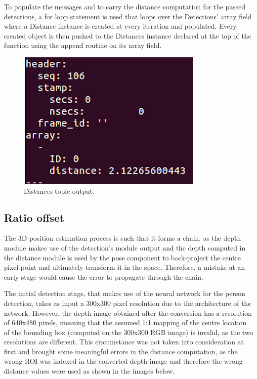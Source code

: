To populate the messages and to carry the distance computation for the passed detections, a for loop statement is used that loops over the Detections' array field where a Distance instance is created at every iteration and populated. Every created object is then pushed to the Distances instance declared at the top of the function using the append routine on its array field.

\begin{figure}[H]
  \begin{center}
    \includegraphics[width=.5\linewidth]{images/chapter4.png}
  \end{center}
  \caption{Distances topic output.}
  \label{fig:distance_topic}
\end{figure}

\subsection{Ratio offset}

The 3D position estimation process is such that it forms a chain, as the depth module makes use of the detection's module output and the depth computed in the distance module is used by the pose component to back-project the centre pixel point and ultimately transform it in the space. Therefore, a mistake at an early stage would cause the error to propagate through the chain.

The initial detection stage, that makes use of the neural network for the person detection, takes as input a 300x300 pixel resolution due to the architecture of the network. However, the depth-image obtained after the conversion has a resolution of 640x480 pixels, meaning that the assumed 1:1 mapping of the centre location of the bounding box (computed on the 300x300 RGB image) is invalid, as the two resolutions are different. This circumstance was not taken into consideration at first and brought some meaningful errors in the distance computation, as the wrong ROI was indexed in the converted depth-image and therefore the wrong distance values were used as shown in the images below.

